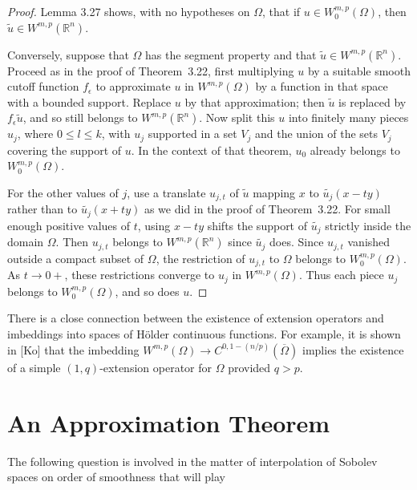 \begin{proof}
  Lemma 3.27 shows, with no hypotheses on $\Omega$, that if $u\in W_0^{m,p}(\Omega)$,
  then $\tilde u\in W^{m,p}(\mathbb{R}^n)$.

  Conversely, suppose that $\Omega$ has the segment property and that
  $\tilde u\in W^{m,p}(\mathbb{R}^n)$. Proceed as in the proof of Theorem~3.22,
  first multiplying $u$ by a suitable smooth cutoff function $f_{\epsilon}$
  to approximate $u$ in $W^{m,p}(\Omega)$ by a function in that space
  with a bounded support. Replace $u$ by that approximation; then $\tilde u$
  is replaced by $f_{\epsilon} \tilde{u}$, and so still belongs to
  $W^{m,p}(\mathbb{R}^n)$. Now split this $u$ into finitely many pieces $u_j$,
  where $0\leq l\leq k$, with $u_j$ supported in a set $V_j$ and the union
  of the sets $V_j$ covering the support of $u$. In the context of that
  theorem, $u_0$ already belongs to $W_0^{m,p}(\Omega)$.

  For the other values of $j$, use a translate $u_{j,t}$ of $\tilde u$
  mapping $x$ to $\tilde{u_j}(x-ty)$ rather than to $\tilde{u_j}(x+ty)$
  as we did in the proof of Theorem~3.22. For small enough positive values
  of $t$, using $x-ty$ shifts the support of $\tilde{u_j}$ strictly
  inside the domain $\Omega$. Then $u_{j,t}$ belongs to $W^{m,p}(\mathbb{R}^n)$
  since $\tilde{u_j}$ does. Since $u_{j,t}$ vanished outside a compact subset
  of $\Omega$, the restriction of $u_{j,t}$ to $\Omega$ belongs to
  $W^{m,p}_0(\Omega)$. As $t\to 0+$, these restrictions converge to $u_j$
  in $W^{m,p}(\Omega)$. Thus each piece $u_j$ belongs to $W_0^{m,p}(\Omega)$,
  and so does $u$.
\end{proof}


\begin{para}
  There is a close connection between the existence of extension operators
  and imbeddings into spaces of H\"older continuous functions. For example,
  it is shown in [Ko] that the imbedding $W^{m,p}(\Omega) \to
  C^{0,1-(n/p)}(\overline{\Omega})$ implies the existence of a simple
  $(1,q)$-extension operator for $\Omega$ provided $q>p$.
\end{para}


\section{An Approximation Theorem}

\begin{para}
  The following question is involved in the matter of interpolation of
  Sobolev spaces on order of smoothness that will play
\end{para}